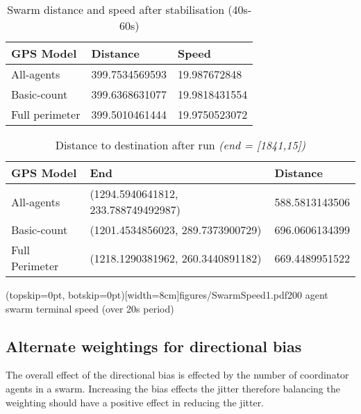\documentclass{ieeeaccess}
\begin{document}
\begin{table}
\begin{center}
\begin{tabular}{| l | l | l |}
\hline
GPS Model & Distance & Speed \\ \hline
All-agents &  399.7534569593 & 19.987672848 \\  \hline
Basic-count & 399.6368631077 & 19.9818431554 \\ \hline
Full perimeter & 399.5010461444 & 19.9750523072 \\  \hline
\end{tabular}\caption{Swarm distance and speed after stabilisation (40s-60s)} \label{tab:SwarmSpeed3}
\end{center}
\end{table}

\begin{table}
\begin{center}
\begin{tabular}{| p{1.2cm} | l | l |}
\hline
GPS Model & End & Distance \\ \hline
All-agents & (1294.5940641812, 233.788749492987) & 588.5813143506\\ \hline
Basic-count & (1201.4534856023, 289.7373900729) & 696.0606134399\\ \hline
Full Perimeter & (1218.1290381962, 260.3440891182) & 669.4489951522\\ \hline
\end{tabular}\caption[Distance to destination after run]{Distance to destination after run \textit{(end = [1841,15])}}\label{tab:SwarmDistanceEnd}
\end{center}
\end{table}


\Figure[t!](topskip=0pt, botskip=0pt)[width=8cm]{figures/SwarmSpeed1.pdf}{200 agent swarm terminal speed (over 20s period)\label{fig:SwarmSpeed1}}

\subsection{Alternate weightings for directional bias}\label{sec:AlternateBias1}
The overall effect of the directional bias is effected by the number of coordinator agents in a swarm. Increasing the bias effects the jitter therefore balancing the weighting should have a positive effect in reducing the jitter.
\end{document}
